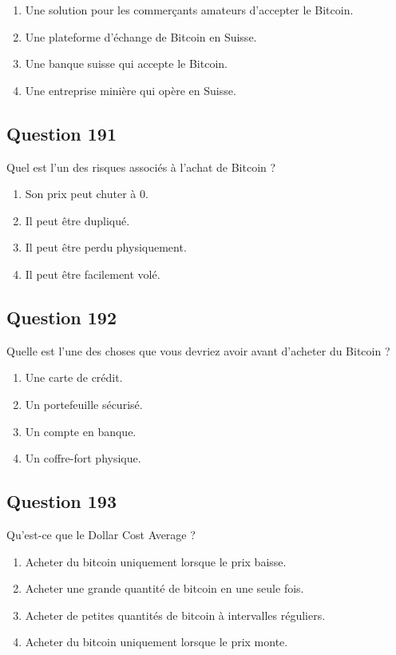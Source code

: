 \documentclass[12pt,a4paper]{article}
\begin{document}
\begin{enumerate}[label=\Alph*., leftmargin=*]
\item Une solution pour les commerçants amateurs d'accepter le Bitcoin.
\item Une plateforme d'échange de Bitcoin en Suisse.
\item Une banque suisse qui accepte le Bitcoin.
\item Une entreprise minière qui opère en Suisse.
\end{enumerate}

\bigskip


\subsection*{Question 191}
Quel est l'un des risques associés à l'achat de Bitcoin ?

\begin{enumerate}[label=\Alph*., leftmargin=*]
\item Son prix peut chuter à 0.
\item Il peut être dupliqué.
\item Il peut être perdu physiquement.
\item Il peut être facilement volé.
\end{enumerate}

\bigskip


\subsection*{Question 192}
Quelle est l'une des choses que vous devriez avoir avant d'acheter du Bitcoin ?

\begin{enumerate}[label=\Alph*., leftmargin=*]
\item Une carte de crédit.
\item Un portefeuille sécurisé.
\item Un compte en banque.
\item Un coffre-fort physique.
\end{enumerate}

\bigskip


\subsection*{Question 193}
Qu'est-ce que le Dollar Cost Average ?

\begin{enumerate}[label=\Alph*., leftmargin=*]
\item Acheter du bitcoin uniquement lorsque le prix baisse.
\item Acheter une grande quantité de bitcoin en une seule fois.
\item Acheter de petites quantités de bitcoin à intervalles réguliers.
\item Acheter du bitcoin uniquement lorsque le prix monte.
\end{enumerate}
\end{document}
